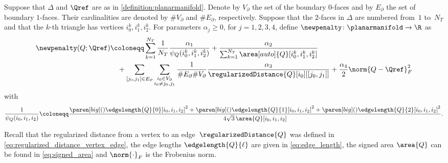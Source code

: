 \begin{definition}
	\label{definition:phi}
	Suppose that $\Delta$ and $\Qref$ are as in \cref{definition:planarmanifold}.
	Denote by $V_\partial$ the set of the boundary $0$-faces and by $E_\partial$ the set of boundary $1$-faces.
	Their cardinalities are denoted by $\#V_\partial$ and $\#E_\partial$, respectively.
	Suppose that the $2$-faces in $\Delta$ are numbered from~$1$ to~$N_T$ and that the $k$-th triangle has vertices $i_0^k, i_1^k, i_2^k$.
	For parameters $\alpha_j \ge 0$, for $j=1,2,3,4$, define $\newpenalty \colon \planarmanifold \to \R$ as
	\begin{equation}
		\label{eq:penalization}
		\begin{aligned}
			\newpenalty(Q;\Qref)
			&
			\coloneqq
			\sum_{k=1}^{N_T} \frac{1}{N_T} \frac{\alpha_1}{\psi_Q(i_0^k,i_1^k,i_2^k)}
			+
			\frac{\alpha_2}{\sum_{k=1}^{N_T}\area[auto]{Q}[i_0^k,i_1^k,i_2^k] }
			\\
			&
			\quad
			+
			\sum_{[j_0,j_1] \in E_\partial}
			\sum_{\substack{i_0 \in V_\partial \\ i_0 \neq j_0,j_1}} \frac{1}{\#E_\partial \#V_\partial} \frac{\alpha_3}{\regularizedDistance{Q}[i_0][[j_0,j_1]]}
			+
			\frac{\alpha_4}{2} \norm{Q-\Qref}_F^2
		\end{aligned}
	\end{equation}
	with
	\begin{equation}
		\label{eq:Shewchuk64_qualitymeasure}
		\frac{1}{\psi_Q(i_0,i_1,i_2)}
		\coloneqq
		\frac{\paren[big](){\edgelength{Q}{0}[i_0,i_1,i_2]}^2+\paren[big](){\edgelength{Q}{1}[i_0,i_1,i_2]}^2+\paren[big](){\edgelength{Q}{2}[i_0,i_1,i_2]}^2}{4 \sqrt{3} \, \area{Q}[i_0,i_1,i_2]}
		.
	\end{equation}
\end{definition}
Recall that the regularized distance from a vertex to an edge~$\regularizedDistance{Q}$ was defined in \eqref{eq:regularized_distance_vertex_edge}, the edge lengths $\edgelength{Q}{\ell}$ are given in \eqref{eq:edge_length}, the signed area $\area{Q}$ can be found in \eqref{eq:signed_area} and $\norm{\cdot}_F$ is the Frobenius norm.

